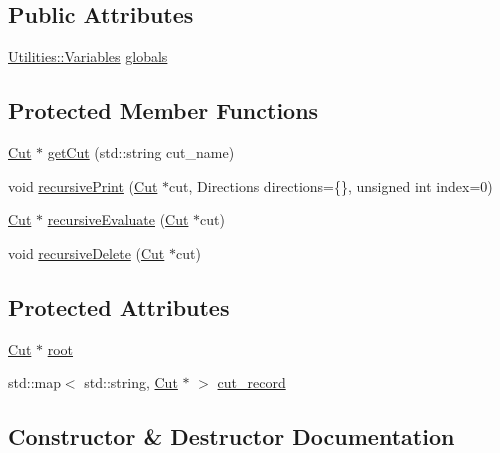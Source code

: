 \subsection*{Public Attributes}
\begin{DoxyCompactItemize}
\item 
\hyperlink{classUtilities_1_1Variables}{Utilities\+::\+Variables} \hyperlink{classCutflow_a71390324488ac6ed4a72c41f4a2c1c10}{globals}
\end{DoxyCompactItemize}
\subsection*{Protected Member Functions}
\begin{DoxyCompactItemize}
\item 
\hyperlink{classCut}{Cut} $\ast$ \hyperlink{classCutflow_a20193ee89ee39b0fc58ab4f27e2779db}{get\+Cut} (std\+::string cut\+\_\+name)
\item 
void \hyperlink{classCutflow_a4acc0465c3fd23989e60db56583b1a3e}{recursive\+Print} (\hyperlink{classCut}{Cut} $\ast$cut, Directions directions=\{\}, unsigned int index=0)
\item 
\hyperlink{classCut}{Cut} $\ast$ \hyperlink{classCutflow_ae4fc37122bc9437fe3cdaa9861c2bcec}{recursive\+Evaluate} (\hyperlink{classCut}{Cut} $\ast$cut)
\item 
void \hyperlink{classCutflow_adc7029b27ff8d742d10c75d6f6342dac}{recursive\+Delete} (\hyperlink{classCut}{Cut} $\ast$cut)
\end{DoxyCompactItemize}
\subsection*{Protected Attributes}
\begin{DoxyCompactItemize}
\item 
\hyperlink{classCut}{Cut} $\ast$ \hyperlink{classCutflow_a96f2343bfae77c94f2e87b5f3a128d6d}{root}
\item 
std\+::map$<$ std\+::string, \hyperlink{classCut}{Cut} $\ast$ $>$ \hyperlink{classCutflow_a76f5cbd82750844d379384c7b1243cca}{cut\+\_\+record}
\end{DoxyCompactItemize}


\subsection{Constructor \& Destructor Documentation}
